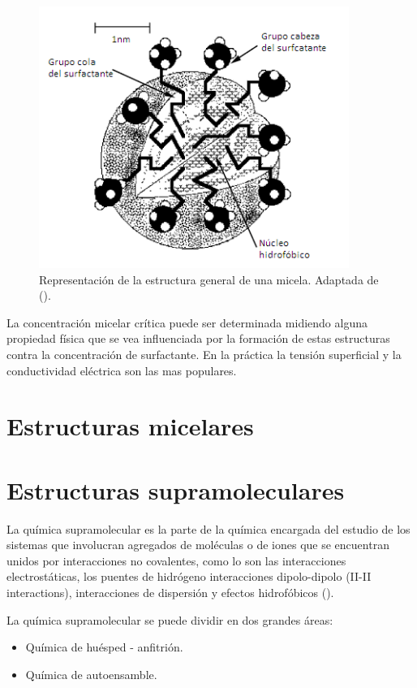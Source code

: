 \begin{figure}
    \centering
    \includegraphics[width=0.9\textwidth]{Graphics/micela.png}
    \caption[Estructura general de una micela]{Representación de la estructura general de una micela. Adaptada de (\cite{Pashley}). }
    \label{fig:micela}
\end{figure}

La concentración micelar crítica puede ser determinada midiendo alguna propiedad física que se vea influenciada por la formación de estas estructuras contra la concentración de surfactante. En la práctica la tensión superficial y la conductividad eléctrica son las mas populares.

\section{Estructuras micelares}

\section{Estructuras supramoleculares}

La química supramolecular es la parte de la química encargada del estudio de los sistemas que involucran agregados de moléculas o de iones que se encuentran unidos por interacciones no covalentes, como lo son las interacciones electrostáticas, los puentes de hidrógeno  interacciones dipolo-dipolo (II-II interactions), interacciones de dispersión y efectos hidrofóbicos (\cite{IMP:Patente}).

La química supramolecular se puede dividir en dos grandes áreas:
\begin{itemize}
    \item Química de huésped - anfitrión.
    \item Química de autoensamble.
\end{itemize}

